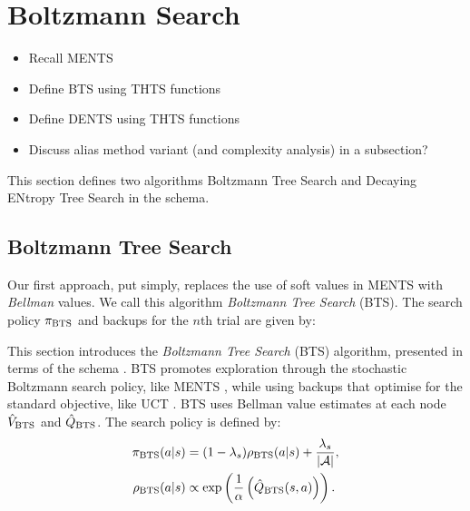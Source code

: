 \section{Boltzmann Search}
\label{sec:4-2-boltzmannsearch}

    \begin{itemize}
        \item Recall MENTS
        \item Define BTS using THTS functions
        \item Define DENTS using THTS functions
        \item Discuss alias method variant (and complexity analysis) in a subsection?
    \end{itemize}


    This section defines two algorithms Boltzmann Tree Search and Decaying ENtropy Tree Search in the \thtspp\ewe schema. 
    
    \subsection{Boltzmann Tree Search}




        Our first approach, put simply, replaces the use of soft values in MENTS with 
        \textit{Bellman} 
        values. We call this algorithm \textit{Boltzmann Tree Search} (BTS).  The search policy $\pi_{\textnormal{BTS}}$ and backups for the $n$th trial are given by:


        This section introduces the \textit{Boltzmann Tree Search} (BTS) algorithm, presented in terms of the \thtspp\ewe schema . BTS promotes exploration through the stochastic Boltzmann search policy, like MENTS , while using backups that optimise for the standard objective, like UCT . BTS uses Bellman value estimates at each node ${\hat{V}_{{\textnormal{BTS}}}}$ and ${\hat{Q}_{{\textnormal{BTS}}}}$. The search policy is defined by:
        \begin{align}
            {\pi_{{\textnormal{BTS}}}}(a|s) &= (1-\lambda_s){\rho_{{\textnormal{BTS}}}}(a|s) + \frac{\lambda_s}{|\mathcal{A}|}, 
                        \label{eq:bts_search_policy} \\ 
            {\rho_{{\textnormal{BTS}}}}(a|s) &\propto \exp\left(\frac{1}{\alpha}\left({\hat{Q}_{{\textnormal{BTS}}}}(s,a)\right)\right).
                        \label{eq:bts_value_policy}
        \end{align}

